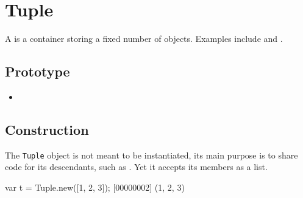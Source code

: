 \section{Tuple}

A  is a container storing a fixed number of objects.
Examples include  and .

\subsection{Prototype}
\begin{itemize}
\item {}
\end{itemize}

\subsection{Construction}

The \lstinline|Tuple| object is not meant to be instantiated, its main
purpose is to share code for its descendants, such as .
Yet it accepts its members as a list.

\begin{urbiscript}[firstnumber=1]
var t = Tuple.new([1, 2, 3]);
[00000002] (1, 2, 3)
\end{urbiscript}

